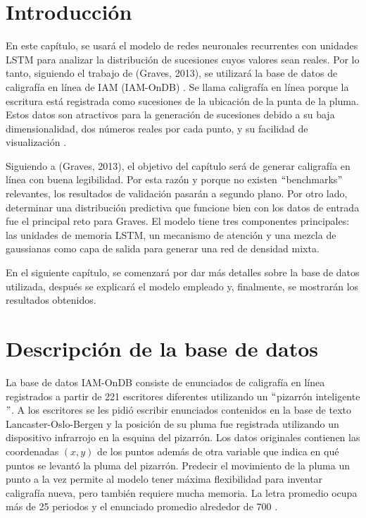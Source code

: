 \section{Introducción}
En este capítulo, se usará el modelo de redes neuronales recurrentes con unidades LSTM para analizar la distribución de sucesiones cuyos valores sean reales. Por lo tanto, siguiendo el trabajo de (Graves, 2013), se utilizará la base de datos de caligrafía en línea de IAM (IAM-OnDB) \cite{handwriting}. 
Se llama caligrafía en línea porque la escritura está registrada como sucesiones de la ubicación de la punta de la pluma. Estos datos son atractivos para la generación de sucesiones debido a su baja dimensionalidad, dos números reales por cada punto, y su facilidad de visualización \cite{handwriting} \cite{DBLP:journals/corr/Graves13}.


\vspace{1em}

Siguiendo a (Graves, 2013), el objetivo del capítulo será de generar caligrafía en línea con buena legibilidad. Por esta razón y porque no existen $``$benchmarks$"$ relevantes, los resultados de validación pasarán a segundo plano. Por otro lado, determinar una distribución predictiva que funcione bien con los datos de entrada fue el principal reto para Graves. El modelo tiene tres componentes principales: las unidades de memoria LSTM, un mecanismo de atención y una mezcla de gaussianas como capa de salida para generar una red de densidad mixta. 

\vspace{1em}

En el siguiente capítulo, se comenzará por dar más detalles sobre la base de datos utilizada, después se explicará el modelo empleado y, finalmente, se mostrarán los resultados obtenidos.


\section{Descripción de la base de datos}
La base de datos IAM-OnDB consiste de enunciados de caligrafía en línea registrados a partir de 221 escritores diferentes utilizando un $``$pizarrón inteligente$"$. A los escritores se les pidió escribir enunciados contenidos en la base de texto Lancaster-Oslo-Bergen y la posición de su pluma fue registrada utilizando un dispositivo infrarrojo en la esquina del pizarrón. Los datos originales contienen las coordenadas $(x,y)$ de los puntos además de otra variable que indica en qué puntos se levantó la pluma del pizarrón. Predecir el movimiento de la pluma un punto a la vez permite al modelo tener máxima flexibilidad para inventar caligrafía nueva, pero también requiere mucha memoria. La letra promedio ocupa más de 25 periodos y el enunciado promedio alrededor de 700 \cite{DBLP:journals/corr/Graves13}.

